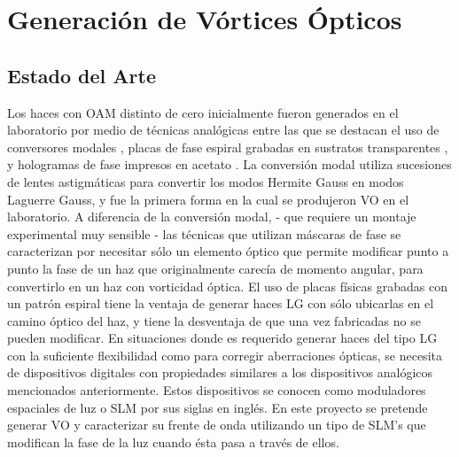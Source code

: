 

\chapter{Generación de Vórtices Ópticos}
\label{cha:Gen_intro}

\graphicspath{{Figures/ch2_img/}{../Figures/ch2_img/}}
\section{Estado del Arte}
\label{sec:estado_del_arte}
Los haces con OAM distinto de cero inicialmente fueron generados en el
laboratorio por medio de técnicas analógicas entre las que se destacan
el uso de conversores modales , placas de fase espiral grabadas en sustratos
transparentes , y hologramas de fase impresos en acetato
 . La conversión modal utiliza sucesiones de
lentes astigmáticas para convertir los modos Hermite Gauss en modos
Laguerre Gauss, y fue la primera forma en la cual se produjeron VO en
el laboratorio. A diferencia de la conversión modal, - que requiere un
montaje experimental muy sensible -  las técnicas que utilizan máscaras
de fase se caracterizan por necesitar sólo un elemento óptico que
permite modificar punto a punto la fase de un haz que originalmente
carecía de momento angular, para convertirlo en un haz con vorticidad
óptica. El uso de placas físicas grabadas con un patrón espiral
tiene la ventaja de generar haces LG con sólo ubicarlas en
el camino óptico del haz, y tiene la desventaja de que una vez
fabricadas no se pueden modificar. 
En situaciones donde es requerido generar haces del tipo LG con la suficiente
flexibilidad como para corregir aberraciones ópticas, se
necesita de dispositivos digitales con propiedades similares a los
dispositivos analógicos mencionados anteriormente. Estos dispositivos
se conocen como moduladores espaciales de luz o SLM por sus siglas en
inglés. En este proyecto se pretende generar VO y caracterizar su
frente de onda utilizando un tipo de SLM's que modifican la fase de la
luz cuando ésta pasa a través de ellos. 

